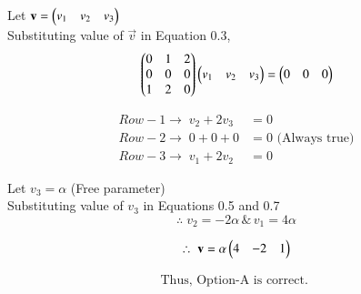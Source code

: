 \documentclass[journal]{IEEEtran}
\begin{document}
Let $\mathbf{v} = \begin{pmatrix}v_1 & v_2 & v_3\end{pmatrix}$\\

Substituting value of $\vec{v}$ in Equation 0.3,
\begin{equation}
   \begin{pmatrix}0 & 1 & 2 \\ 0 & 0 & 0 \\ 1 & 2 & 0\end{pmatrix}\begin{pmatrix}v_1 & v_2 & v_3\end{pmatrix} = \begin{pmatrix}0 & 0 & 0\end{pmatrix} 
\end{equation}

\begin{align}
    Row-1 \rightarrow \; v_2 + 2v_3 &= 0\\
    Row-2 \rightarrow \; 0 + 0 + 0&= 0 \text{ (Always true)}\\
    Row-3 \rightarrow \; v_1 + 2v_2 &= 0
\end{align}

\newpage

Let $v_3 = \alpha$ (Free parameter)\\
Substituting value of $v_3$ in Equations 0.5 and 0.7
\begin{equation}
\therefore \; v_2 = -2\alpha \, \&  \, v_1 = 4\alpha  
\end{equation}

\begin{equation}
    \therefore \; \mathbf{v} = \alpha \begin{pmatrix}4 & -2 & 1\end{pmatrix} 
\end{equation}

\begin{align*}
    \boxed{\text{Thus, Option-A is correct. }}
\end{align*}
\end{document}
